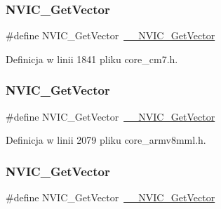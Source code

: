 \subsubsection{\texorpdfstring{N\+V\+I\+C\+\_\+\+Get\+Vector}{NVIC\_GetVector}\hspace{0.1cm}{\footnotesize\ttfamily [10/12]}}
{\footnotesize\ttfamily \#define N\+V\+I\+C\+\_\+\+Get\+Vector~\hyperlink{group___c_m_s_i_s___core___n_v_i_c_functions_ga44b665d2afb708121d9b10c76ff00ee5}{\+\_\+\+\_\+\+N\+V\+I\+C\+\_\+\+Get\+Vector}}



Definicja w linii 1841 pliku core\+\_\+cm7.\+h.

\mbox{\label{group___c_m_s_i_s___core___n_v_i_c_functions_ga955eb1c33a3dcc62af11a8385e8c0fc8}} 
\subsubsection{\texorpdfstring{N\+V\+I\+C\+\_\+\+Get\+Vector}{NVIC\_GetVector}\hspace{0.1cm}{\footnotesize\ttfamily [11/12]}}
{\footnotesize\ttfamily \#define N\+V\+I\+C\+\_\+\+Get\+Vector~\hyperlink{group___c_m_s_i_s___core___n_v_i_c_functions_ga44b665d2afb708121d9b10c76ff00ee5}{\+\_\+\+\_\+\+N\+V\+I\+C\+\_\+\+Get\+Vector}}



Definicja w linii 2079 pliku core\+\_\+armv8mml.\+h.

\mbox{\label{group___c_m_s_i_s___core___n_v_i_c_functions_ga955eb1c33a3dcc62af11a8385e8c0fc8}} 
\subsubsection{\texorpdfstring{N\+V\+I\+C\+\_\+\+Get\+Vector}{NVIC\_GetVector}\hspace{0.1cm}{\footnotesize\ttfamily [12/12]}}
{\footnotesize\ttfamily \#define N\+V\+I\+C\+\_\+\+Get\+Vector~\hyperlink{group___c_m_s_i_s___core___n_v_i_c_functions_ga44b665d2afb708121d9b10c76ff00ee5}{\+\_\+\+\_\+\+N\+V\+I\+C\+\_\+\+Get\+Vector}}



